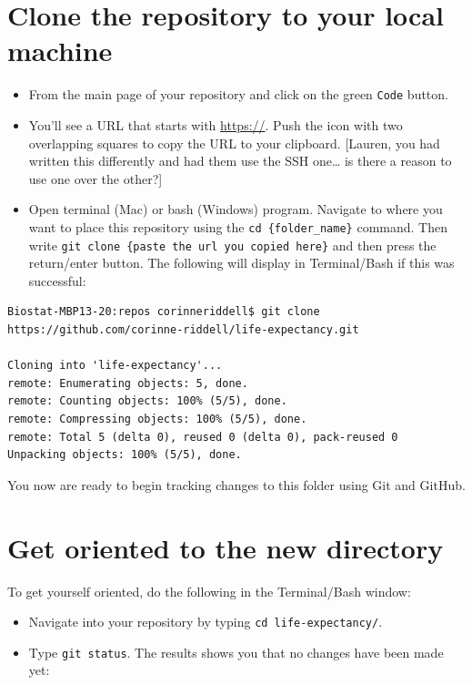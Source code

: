 \documentclass[
]{book}
\providecommand{\tightlist}{%
  \setlength{\itemsep}{0pt}\setlength{\parskip}{0pt}}
\begin{document}
\hypertarget{clone-the-repository-to-your-local-machine}{%
\section{Clone the repository to your local machine}\label{clone-the-repository-to-your-local-machine}}

\begin{itemize}
\tightlist
\item
  From the main page of your repository and click on the green \texttt{Code} button.\\
\item
  You'll see a URL that starts with \url{https://}. Push the icon with two overlapping
  squares to copy the URL to your clipboard. {[}Lauren, you had written this differently and had them use the SSH one\ldots{} is there a reason to use one over the other?{]}
\item
  Open terminal (Mac) or bash (Windows) program. Navigate to where you want to place
  this repository using the \texttt{cd\ \{folder\_name\}} command. Then write
  \texttt{git\ clone\ \{paste\ the\ url\ you\ copied\ here\}} and
  then press the return/enter button. The following will display in Terminal/Bash
  if this was successful:
\end{itemize}

\begin{verbatim}
Biostat-MBP13-20:repos corinneriddell$ git clone https://github.com/corinne-riddell/life-expectancy.git

Cloning into 'life-expectancy'...
remote: Enumerating objects: 5, done.
remote: Counting objects: 100% (5/5), done.
remote: Compressing objects: 100% (5/5), done.
remote: Total 5 (delta 0), reused 0 (delta 0), pack-reused 0
Unpacking objects: 100% (5/5), done.
\end{verbatim}

You now are ready to begin tracking changes to this folder using Git and GitHub.

\hypertarget{get-oriented-to-the-new-directory}{%
\section{Get oriented to the new directory}\label{get-oriented-to-the-new-directory}}

To get yourself oriented, do the following in the Terminal/Bash window:

\begin{itemize}
\tightlist
\item
  Navigate into your repository by typing \texttt{cd\ life-expectancy/}.
\item
  Type \texttt{git\ status}. The results shows you that no changes have been made yet:
\end{itemize}
\end{document}
